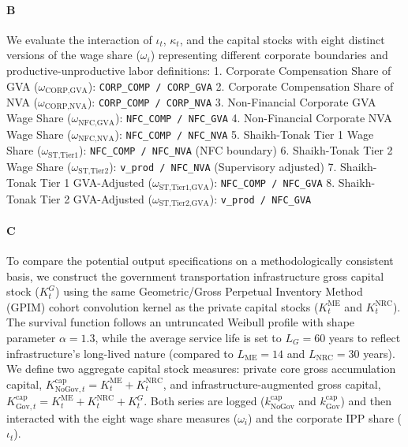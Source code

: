 \documentclass[11pt,a4paper]{article}
\begin{document}
\paragraph{B}
We evaluate the interaction of $\iota_t$, $\kappa_t$, and the capital stocks with eight distinct versions of the wage share ($\omega_i$) representing different corporate boundaries and productive-unproductive labor definitions:
1. Corporate Compensation Share of GVA ($\omega_{\text{CORP,GVA}}$): \texttt{CORP\_COMP / CORP\_GVA}
2. Corporate Compensation Share of NVA ($\omega_{\text{CORP,NVA}}$): \texttt{CORP\_COMP / CORP\_NVA}
3. Non-Financial Corporate GVA Wage Share ($\omega_{\text{NFC,GVA}}$): \texttt{NFC\_COMP / NFC\_GVA}
4. Non-Financial Corporate NVA Wage Share ($\omega_{\text{NFC,NVA}}$): \texttt{NFC\_COMP / NFC\_NVA}
5. Shaikh-Tonak Tier 1 Wage Share ($\omega_{\text{ST,Tier1}}$): \texttt{NFC\_COMP / NFC\_NVA} (NFC boundary)
6. Shaikh-Tonak Tier 2 Wage Share ($\omega_{\text{ST,Tier2}}$): \texttt{v\_prod / NFC\_NVA} (Supervisory adjusted)
7. Shaikh-Tonak Tier 1 GVA-Adjusted ($\omega_{\text{ST,Tier1,GVA}}$): \texttt{NFC\_COMP / NFC\_GVA}
8. Shaikh-Tonak Tier 2 GVA-Adjusted ($\omega_{\text{ST,Tier2,GVA}}$): \texttt{v\_prod / NFC\_GVA}

\paragraph{C}
To compare the potential output specifications on a methodologically consistent basis, we construct the government transportation infrastructure gross capital stock ($K^G_t$) using the same Geometric/Gross Perpetual Inventory Method (GPIM) cohort convolution kernel as the private capital stocks ($K^{\text{ME}}_t$ and $K^{\text{NRC}}_t$). The survival function follows an untruncated Weibull profile with shape parameter $\alpha = 1.3$, while the average service life is set to $L_G = 60$ years to reflect infrastructure's long-lived nature (compared to $L_{\text{ME}} = 14$ and $L_{\text{NRC}} = 30$ years). We define two aggregate capital stock measures: private core gross accumulation capital, $K^{\text{cap}}_{\text{NoGov}, t} = K^{\text{ME}}_t + K^{\text{NRC}}_t$, and infrastructure-augmented gross capital, $K^{\text{cap}}_{\text{Gov}, t} = K^{\text{ME}}_t + K^{\text{NRC}}_t + K^G_t$. Both series are logged ($k^{\text{cap}}_{\text{NoGov}}$ and $k^{\text{cap}}_{\text{Gov}}$) and then interacted with the eight wage share measures ($\omega_i$) and the corporate IPP share ($\iota_t$).
\end{document}
